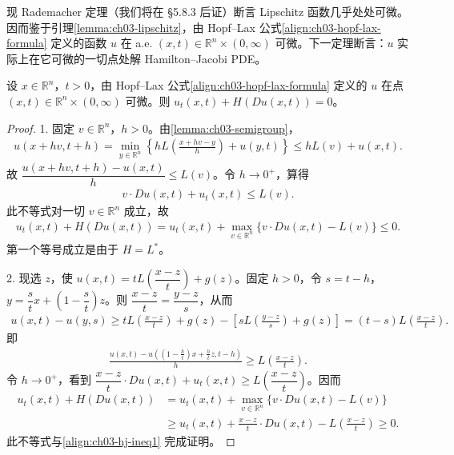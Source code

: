 \documentclass[../../main.tex]{subfiles}
\begin{document}
现 Rademacher 定理（我们将在 \S5.8.3 后证）断言 Lipschitz 函数几乎处处可微。因而鉴于引理\cref{lemma:ch03-lipschitz}，由 Hopf--Lax 公式\eqref{align:ch03-hopf-lax-formula} 定义的函数 $u$ 在 a.e. $(x,t)\in\mathbb{R}^n\times(0,\infty)$ 可微。下一定理断言：$u$ 实际上在它可微的一切点处解 Hamilton--Jacobi PDE。

\begin{theorem}\label{theorem:ch03-hj-solved}设 $x\in\mathbb{R}^n$，$t>0$，由 Hopf--Lax 公式\eqref{align:ch03-hopf-lax-formula} 定义的 $u$ 在点 $(x,t)\in\mathbb{R}^n\times(0,\infty)$ 可微。则 $u_t(x,t)+H(Du(x,t))=0$。
\end{theorem}

\begin{proof}
1. 固定 $v\in\mathbb{R}^n$，$h>0$。由\cref{lemma:ch03-semigroup}，
\begin{align*}
u(x+hv,t+h)=\min_{y\in\mathbb{R}^n}\left\{hL\!\left(\frac{x+hv-y}{h}\right)+u(y,t)\right\}
\leqslant hL(v)+u(x,t).
\end{align*}
故 $\dfrac{u(x+hv,t+h)-u(x,t)}{h}\leqslant L(v)$。令 $h\to 0^+$，算得
\begin{align*}
v\cdot Du(x,t)+u_t(x,t)\leqslant L(v).
\end{align*}
此不等式对一切 $v\in\mathbb{R}^n$ 成立，故
\begin{align}\label{align:ch03-hj-ineq1}
u_t(x,t)+H(Du(x,t))=u_t(x,t)+\max_{v\in\mathbb{R}^n}\{v\cdot Du(x,t)-L(v)\}\leqslant 0.
\end{align}
第一个等号成立是由于 $H=L^*$。

2. 现选 $z$，使 $u(x,t)=tL\!\left(\dfrac{x-z}{t}\right)+g(z)$。固定 $h>0$，令 $s=t-h$，$y=\dfrac{s}{t}x+\left(1-\dfrac{s}{t}\right)z$。则 $\dfrac{x-z}{t}=\dfrac{y-z}{s}$，从而
\begin{align*}
u(x,t)-u(y,s)\geqslant tL\!\left(\frac{x-z}{t}\right)+g(z)-\left[sL\!\left(\frac{y-z}{s}\right)+g(z)\right]=(t-s)L\!\left(\frac{x-z}{t}\right).
\end{align*}
即
\begin{align*}
\frac{u(x,t)-u\!\left(\left(1-\frac{h}{t}\right)x+\frac{h}{t}z,t-h\right)}{h}\geqslant L\!\left(\frac{x-z}{t}\right).
\end{align*}
令 $h\to 0^+$，看到 $\dfrac{x-z}{t}\cdot Du(x,t)+u_t(x,t)\geqslant L\!\left(\dfrac{x-z}{t}\right)$。因而
\begin{align*}
u_t(x,t)+H(Du(x,t))&=u_t(x,t)+\max_{v\in\mathbb{R}^n}\{v\cdot Du(x,t)-L(v)\}\\
&\geqslant u_t(x,t)+\frac{x-z}{t}\cdot Du(x,t)-L\!\left(\frac{x-z}{t}\right)\geqslant 0.
\end{align*}
此不等式与\eqref{align:ch03-hj-ineq1} 完成证明。
\end{proof}
\end{document}
